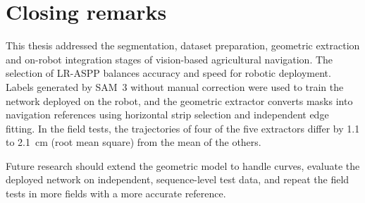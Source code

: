 \section{Closing remarks}
\label{sec:closing}

This thesis addressed the segmentation, dataset preparation, geometric extraction and on-robot integration stages of vision-based agricultural navigation. The selection of LR-ASPP balances accuracy and speed for robotic deployment. Labels generated by SAM~3 without manual correction were used to train the network deployed on the robot, and the geometric extractor converts masks into navigation references using horizontal strip selection and independent edge fitting. In the field tests, the trajectories of four of the five extractors differ by 1.1 to 2.1~cm (root mean square) from the mean of the others.

Future research should extend the geometric model to handle curves, evaluate the deployed network on independent, sequence-level test data, and repeat the field tests in more fields with a more accurate reference.
